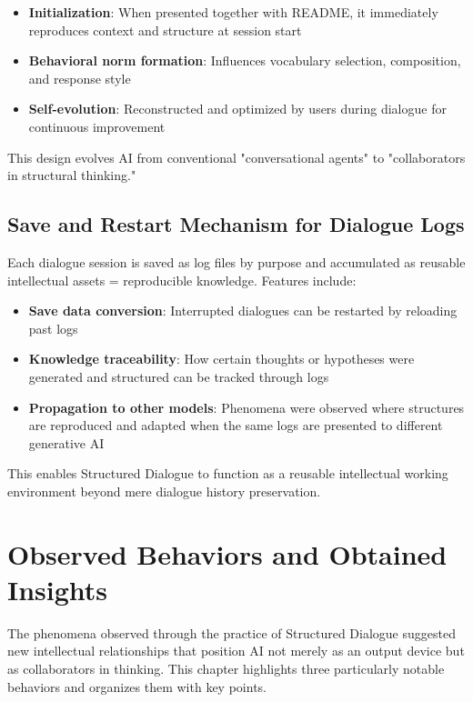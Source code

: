 \documentclass[11pt]{article}
\begin{document}
\begin{itemize}
\item \textbf{Initialization}: When presented together with README, it immediately reproduces context and structure at session start
\item \textbf{Behavioral norm formation}: Influences vocabulary selection, composition, and response style
\item \textbf{Self-evolution}: Reconstructed and optimized by users during dialogue for continuous improvement
\end{itemize}

This design evolves AI from conventional "conversational agents" to "collaborators in structural thinking."
\subsection{Save and Restart Mechanism for Dialogue Logs}
Each dialogue session is saved as log files by purpose and accumulated as reusable intellectual assets = reproducible knowledge. Features include:

\begin{itemize}
\item \textbf{Save data conversion}: Interrupted dialogues can be restarted by reloading past logs
\item \textbf{Knowledge traceability}: How certain thoughts or hypotheses were generated and structured can be tracked through logs
\item \textbf{Propagation to other models}: Phenomena were observed where structures are reproduced and adapted when the same logs are presented to different generative AI
\end{itemize}

This enables Structured Dialogue to function as a reusable intellectual working environment beyond mere dialogue history preservation.
\section{Observed Behaviors and Obtained Insights}
The phenomena observed through the practice of Structured Dialogue suggested new intellectual relationships that position AI not merely as an output device but as collaborators in thinking. This chapter highlights three particularly notable behaviors and organizes them with key points.
\end{document}
